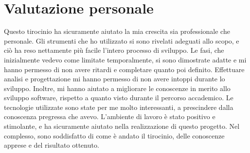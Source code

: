 \section{Valutazione personale}
Questo tirocinio ha sicuramente aiutato la mia crescita sia professionale che personale.
Gli strumenti che ho utilizzato si sono rivelati adeguati allo scopo, e ciò ha reso nettamente più facile l'intero processo di sviluppo.
Le fasi, che inizialmente vedevo come limitate temporalmente, si sono dimostrate adatte e mi hanno permesso di non avere ritardi e completare quanto poi definito.
Effettuare analisi e progettazione mi hanno permesso di non avere intoppi durante lo sviluppo. Inoltre, mi hanno aiutato a migliorare le conoscenze in merito allo sviluppo software, rispetto a quanto visto durante il percorso accademico.
Le tecnologie utilizzate sono state per me molto interessanti, a prescindere dalla conoscenza pregressa che avevo.
L'ambiente di lavoro è stato positivo e stimolante, e ha sicuramente aiutato nella realizzazione di questo progetto.
Nel complesso, sono soddisfatto di come è andato il tirocinio, delle conoscenze apprese e del risultato ottenuto. 